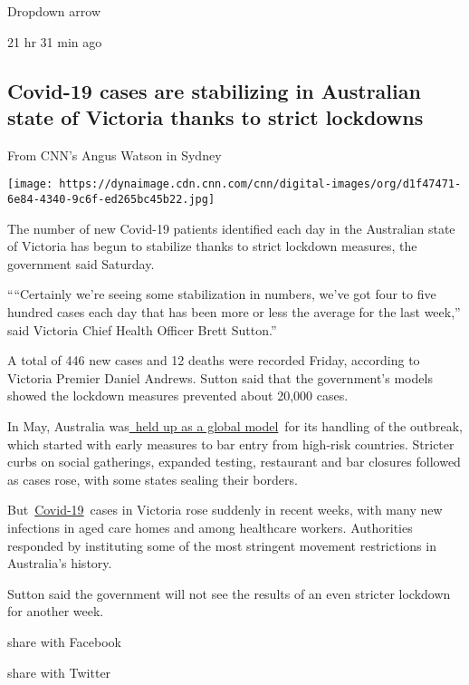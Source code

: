 Dropdown arrow

21 hr 31 min ago

\hypertarget{covid-19-cases-are-stabilizing-in-australian-state-of-victoria-thanks-to-strict-lockdowns}{%
\subsection{Covid-19 cases are stabilizing in Australian state of
Victoria thanks to strict
lockdowns}\label{covid-19-cases-are-stabilizing-in-australian-state-of-victoria-thanks-to-strict-lockdowns}}

From CNN's Angus Watson in Sydney

\texttt{[image: https://dynaimage.cdn.cnn.com/cnn/digital-images/org/d1f47471-6e84-4340-9c6f-ed265bc45b22.jpg]}

The number of new Covid-19 patients identified each day in the
Australian state of Victoria has begun to stabilize thanks to strict
lockdown measures, the government said Saturday.

````Certainly we're seeing some stabilization in numbers, we've got four
to five hundred cases each day that has been more or less the average
for the last week,'' said Victoria Chief Health Officer Brett Sutton.''

A total of 446 new cases and 12 deaths were recorded Friday, according
to Victoria Premier Daniel Andrews. Sutton said that the government's
models showed the lockdown measures prevented about 20,000 cases.

In May, Australia
was\href{https://www.cnn.com/2020/05/01/asia/australia-coronavirus-success-intl-hnk/index.html}{~held
up as a global model}~for its handling of the outbreak, which started
with early measures to bar entry from high-risk countries. Stricter
curbs on social gatherings, expanded testing, restaurant and bar
closures followed as cases rose, with some states sealing their borders.

But~\href{https://www.cnn.com/2020/03/31/health/what-is-coronavirus-covid-19-wellness/index.html}{Covid-19}~cases
in Victoria rose suddenly in recent weeks, with many new infections in
aged care homes and among healthcare workers. Authorities responded by
instituting some of the most stringent movement restrictions in
Australia's history.

Sutton said the government will not see the results of an even stricter
lockdown for another week.

share with Facebook

share with Twitter

